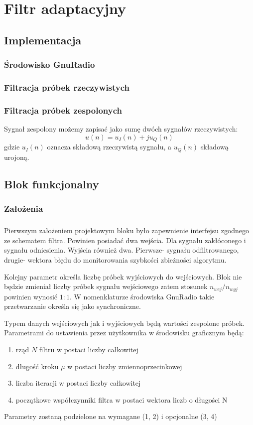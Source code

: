 \chapter{Filtr adaptacyjny}
\section{Implementacja}
\subsection{Środowisko GnuRadio}
\subsection{Filtracja próbek rzeczywistych}
\subsection{Filtracja próbek zespolonych}
Sygnał zespolony możemy zapisać jako sumę dwóch sygnałów rzeczywistych:
\begin{equation}
u(n) = u_I(n) + ju_Q(n)
\end{equation}
gdzie $u_I(n)$ oznacza składową rzeczywistą sygnału, a $u_Q(n)$ składową urojoną.
\section{Blok funkcjonalny}
\subsection{Założenia}
\paragraph{}
Pierwszym założeniem projektowym bloku było zapewnienie interfejsu zgodnego ze schematem filtra. 
Powinien posiadać dwa wejścia. 
Dla sygnału zakłóconego i sygnału odniesienia. Wyjścia również dwa. 
Pierwsze- sygnału odfiltrowanego, drugie- wektora błędu do monitorowania szybkości zbieżności algorytmu.

Kolejny parametr określa liczbę próbek wyjściowych do wejściowych.
Blok nie będzie zmieniał liczby próbek sygnału wejściowego zatem stosunek $n_{wej}/n_{wyj}$
powinien wynosić $1:1$. W nomenklaturze środowiska GnuRadio takie przetwarzanie określa się jako synchroniczne.

Typem danych wejściowych jak i wyjściowych będą wartości zespolone próbek.
Parametrami do ustawienia przez użytkownika w środowisku graficznym będą:
\begin{enumerate}
 \item rząd $N$ filtru w postaci liczby całkowitej 
 \item długość kroku $\mu$ w postaci liczby zmiennoprzecinkowej
 \item liczba iteracji w postaci liczby całkowitej
 \item początkowe współczynniki filtra w postaci wektora liczb o długości N 
 \end{enumerate}
 
Parametry zostaną podzielone na wymagane (1, 2) i opcjonalne (3, 4)